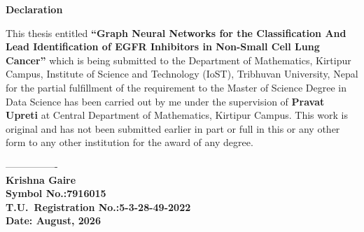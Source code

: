 
\cleardoublepage
{}
{}
\thispagestyle{plain}

\begin{center}
{\fontsize{16}{20}\selectfont\textbf{Declaration}}
\end{center}

\vspace{0.5cm}

\begin{onehalfspace}
\noindent
This thesis entitled \textbf{``Graph Neural Networks for the
Classification And Lead Identification of EGFR Inhibitors in
Non-Small Cell Lung Cancer''} which is being submitted to the
Department of Mathematics, Kirtipur Campus, Institute of Science
and Technology (IoST), Tribhuvan University, Nepal for the partial
fulfillment of the requirement to the Master of Science Degree in
Data Science has been carried out by me under the supervision of
\textbf{Pravat Upreti} at Central Department of
Mathematics, Kirtipur Campus. This work is original and has not
been submitted earlier in part or full in this or any other form
to any other institution for the award of any degree.
\end{onehalfspace}

\vspace{3cm}

\begin{onehalfspace}
\noindent
----------------\\[0.3cm]
\textbf{Krishna Gaire}\\
\textbf{Symbol No.:7916015}\\
\textbf{T.U.\ Registration No.:5-3-28-49-2022}\\[0.3cm]
\textbf{Date: August, 2026}
\end{onehalfspace}